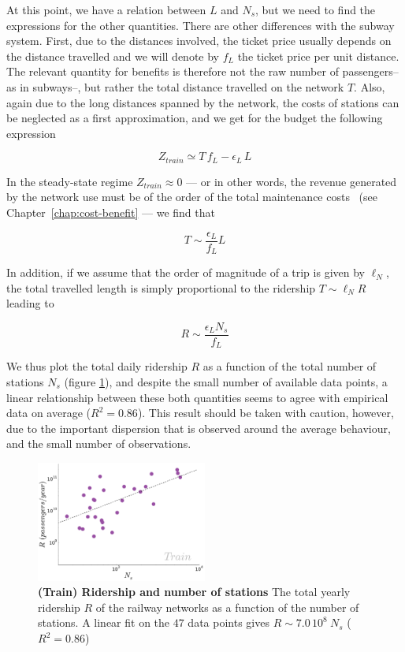 At this point, we have a relation between $L$ and $N_s$, but we need to find the
expressions for the other quantities. There are other differences with the
subway system. First, due to the distances involved, the ticket price usually
depends on the distance travelled and we will denote by $f_L$ the ticket price
per unit distance. The relevant quantity for benefits is therefore not the raw
number of passengers--as in subways--, but rather the total distance travelled
on the network $T$. Also, again due to the long distances spanned by the
network, the costs of stations can be neglected as a first approximation, and we
get for the budget the following expression

\begin{equation}
    Z_{train} \simeq T\, f_L - \epsilon_L\, L
\end{equation}

In the steady-state regime $Z_{train}\approx 0$ --- or in other words, the
revenue generated by the network use must be of the order of the total
maintenance costs~\cite{Louf:2013_emergence} (see
Chapter~\ref{chap:cost-benefit} --- we find that

\begin{equation}
    T \sim \frac{\epsilon_L}{f_L} L
\end{equation}

In addition, if we assume that the order of magnitude of a trip is given by
$\ell_N$, the total travelled length is simply proportional to the ridership
$T\sim \ell_N R$ leading to 

\begin{equation}
    R \sim \frac{\epsilon_LN_s}{f_L}
\end{equation}

We thus plot the total daily ridership $R$ as a function of the total number of
stations $N_s$ (figure \ref{fig:train_rider}), and despite the small number of
available data points, a linear relationship between these both quantities seems
to agree with empirical data on average ($R^2 = 0.86$). This result should be
taken with caution, however, due to the important dispersion that is observed
around the average behaviour, and the small number of observations.

\begin{figure}
    \centering
    \includegraphics[width=0.5\textwidth]{gfx/chapter-networks/rail_ridership_stations.pdf}
    \caption{{\bf(Train) Ridership and number of stations} The total yearly
    ridership $R$ of the railway networks as a function of the number of
stations. A linear fit on the $47$ data points gives $R \sim 7.0\,10^8\:N_s$
($R^2 = 0.86$)} \label{fig:train_rider} 
\end{figure}

